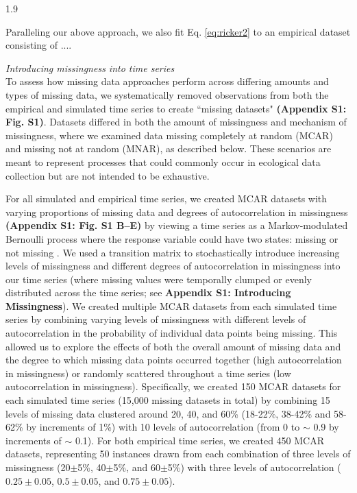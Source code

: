 \documentclass[12pt,english]{article} %
\begin{document}
\begin{linenumbers}
\begin{spacing}{1.9}
\begin{flushleft}
\hspace{1em} Paralleling our above approach, we also fit Eq. \ref{eq:ricker2} to an empirical dataset consisting of .... 


\textit{Introducing missingness into time series} \\
\noindent To assess how missing data approaches perform across differing amounts and types of missing data, we systematically removed observations from both the empirical and simulated time series to create ``missing datasets" \textbf{(Appendix S1: Fig. S1)}. Datasets differed in both the amount of missingness and mechanism of missingness, where we examined data missing completely at random (MCAR) and missing not at random (MNAR), as described below. These scenarios are meant to represent processes that could commonly occur in ecological data collection but are not intended to be exhaustive.

\hspace{1em} For all simulated and empirical time series, we created MCAR datasets with varying proportions of missing data and degrees of autocorrelation in missingness \textbf{(Appendix S1: Fig. S1 B--E)} by viewing a time series as a Markov-modulated Bernoulli process where the response variable could have two states: missing or not missing \citep{Gharib2014, Edwards1960}. We used a transition matrix to stochastically introduce increasing levels of missingness and different degrees of autocorrelation in missingness into our time series (where  missing values were temporally clumped or evenly distributed across the time series; see \textbf{Appendix S1: Introducing Missingness}). We created multiple MCAR datasets from each simulated time series by combining varying levels of missingness with different levels of autocorrelation in the probability of individual data points being missing. This allowed us to explore the effects of both the overall amount of missing data and the degree to which missing data points occurred together (high autocorrelation in missingness) or randomly scattered throughout a time series (low autocorrelation in missingness). Specifically, we created 150 MCAR datasets for each simulated time series (15,000 missing datasets in total) by combining 15 levels of missing data clustered around 20, 40, and 60\% (18-22\%, 38-42\% and 58-62\% by increments of 1\%) with 10 levels of autocorrelation (from 0 to $\sim$ 0.9 by increments of $\sim$ 0.1). For both empirical time series, we created 450 MCAR datasets, representing 50 instances drawn from each combination of three levels of missingness (20$\pm$5\%, 40$\pm$5\%, and 60$\pm$5\%) with three levels of autocorrelation ($0.25\pm0.05$, $0.5\pm0.05$, and $0.75\pm0.05$).


\end{flushleft}
\end{spacing}
\end{linenumbers}
\end{document}
